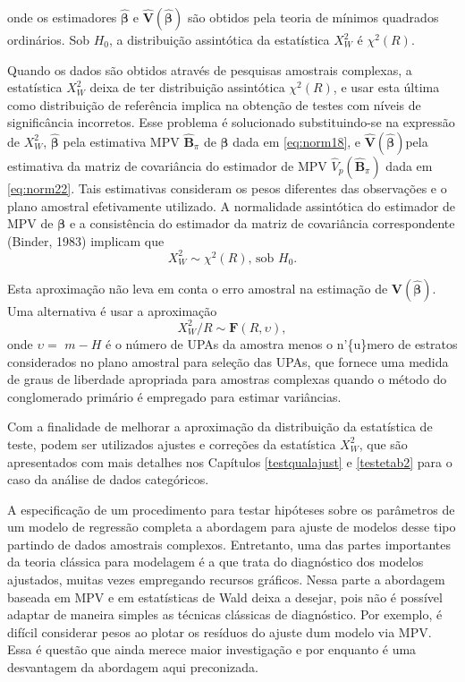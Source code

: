 \documentclass[]{book}
\numberwithin{example}{chapter}
\numberwithin{remark}{chapter}
\numberwithin{definition}{chapter}
\begin{document}
onde os estimadores \(\widehat{\mathbf{\beta }}\) e
\(\widehat{\mathbf{V}}\left( \mathbf{\hat{\beta}}\right)\) são obtidos
pela teoria de mínimos quadrados ordinários. Sob \(H_{0}\), a
distribuição assintótica da estatística \(X_{W}^{2}\) é
\(\chi ^{2}\left(R\right)\).

Quando os dados são obtidos através de pesquisas amostrais complexas, a
estatística \(X_{W}^{2}\) deixa de ter distribuição assintótica
\(\chi ^{2}\left( R\right)\), e usar esta última como distribuição de
referência implica na obtenção de testes com níveis de significância
incorretos. Esse problema é solucionado substituindo-se na expressão de
\(X_{W}^{2}\), \(\mathbf{\hat{\beta}}\) pela estimativa MPV
\(\widehat{\mathbf{B}}_{\pi }\) de \(\mathbf{\beta}\) dada em
\eqref{eq:norm18}, e
\(\widehat{\mathbf{V}}\left( \mathbf{\hat{\beta}}\right)\)pela
estimativa da matriz de covariância do estimador de MPV
\(\hat{V}_{p}\left( \widehat{\mathbf{B}}_{\pi }\right)\) dada em
\eqref{eq:norm22}. Tais estimativas consideram os pesos diferentes das
observações e o plano amostral efetivamente utilizado. A normalidade
assintótica do estimador de MPV de \(\mathbf{\beta}\) e a consistência
do estimador da matriz de covariância correspondente (Binder, 1983)
implicam que \[
X_{W}^{2}\sim \chi^{2}\left( R\right)\mbox{, sob }H_{0}.
\]

Esta aproximação não leva em conta o erro amostral na estimação de
\(\mathbf{V}\left( \mathbf{\hat{\beta}}\right) .\) Uma alternativa é
usar a aproximação \[
X_{W}^{2}/R\sim \mathbf{F}(R,\upsilon),
\] onde \(\upsilon =\) \(m-H\) é o número de UPAs da amostra menos o
n'\{u\}mero de estratos considerados no plano amostral para seleção das
UPAs, que fornece uma medida de graus de liberdade apropriada para
amostras complexas quando o método do conglomerado primário é empregado
para estimar variâncias.

Com a finalidade de melhorar a aproximação da distribuição da
estatística de teste, podem ser utilizados ajustes e correções da
estatística \(X_{W}^{2}\), que são apresentados com mais detalhes nos
Capítulos \ref{testqualajust} e \ref{testetab2} para o caso da análise
de dados categóricos.

A especificação de um procedimento para testar hipóteses sobre os
parâmetros de um modelo de regressão completa a abordagem para ajuste de
modelos desse tipo partindo de dados amostrais complexos. Entretanto,
uma das partes importantes da teoria clássica para modelagem é a que
trata do diagnóstico dos modelos ajustados, muitas vezes empregando
recursos gráficos. Nessa parte a abordagem baseada em MPV e em
estatísticas de Wald deixa a desejar, pois não é possível adaptar de
maneira simples as técnicas clássicas de diagnóstico. Por exemplo, é
difícil considerar pesos ao plotar os resíduos do ajuste dum modelo via
MPV. Essa é questão que ainda merece maior investigação e por enquanto é
uma desvantagem da abordagem aqui preconizada.
\end{document}
